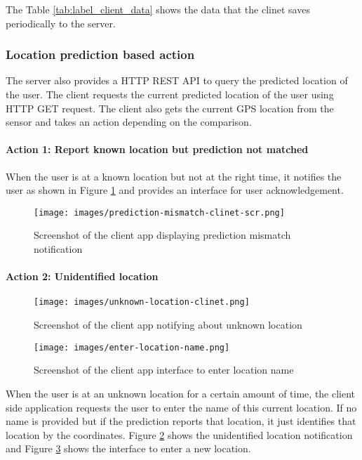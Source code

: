 \documentclass[conference]{IEEEtran}
\begin{document}
The Table \ref{tab:label_client_data} shows the data that the clinet saves periodically to the server.

\subsubsection{Location prediction based action}
The server also provides a HTTP REST API to query the predicted location of the user. The client requests the current predicted location of the user using HTTP GET request. The client also gets the current GPS location from the sensor and takes an action depending on the comparison.

\paragraph{Action 1: Report known location but prediction not matched}
When the user is at a known location but not at the right time, it notifies the user as shown in Figure \ref{fig:clinet_prediction_mismatch} and provides an interface for user acknowledgement.

\begin{figure}[h]
  \centering
  \texttt{[image: images/prediction-mismatch-clinet-scr.png]}
  \caption[Prediction Mismatch]
   {Screenshot of the client app displaying prediction mismatch notification}
   \label{fig:clinet_prediction_mismatch}
\end{figure}

\paragraph{Action 2: Unidentified location}

\begin{figure}[h]
  \centering
  \texttt{[image: images/unknown-location-clinet.png]}
  \caption[Notifying unknown location]
   {Screenshot of the client app notifying about unknown location}
   \label{fig:clinet_notify_unknown_location}
\end{figure}

\begin{figure}[h]
  \centering
  \texttt{[image: images/enter-location-name.png]}
  \caption[Request Location Identity]
   {Screenshot of the client app interface to enter location name}
   \label{fig:clinet_enter_location}
\end{figure}

When the user is at an unknown location for a certain amount of time, the client side application requests the user to enter the name of this current location. If no name is provided but if the prediction reports that location, it just identifies that location by the coordinates. Figure \ref{fig:clinet_notify_unknown_location} shows the unidentified location notification and Figure \ref{fig:clinet_enter_location} shows the interface to enter a new location.
\end{document}
